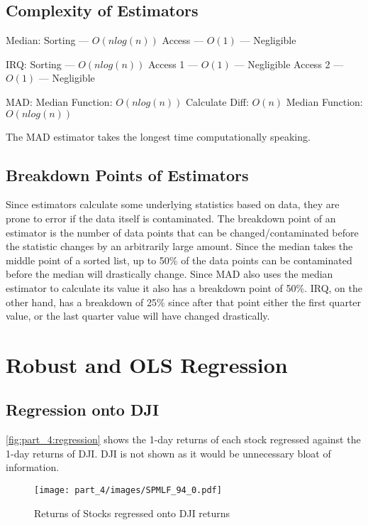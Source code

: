 \subsection{Complexity of Estimators}
Median:    
Sorting — $O(nlog(n))$  
Access — $O(1)$ — Negligible  

IRQ:  
Sorting — $O(nlog(n))$  
Access 1 — $O(1)$ — Negligible  
Access 2 — $O(1)$ — Negligible  

MAD:  
Median Function: $O(nlog(n))$   
Calculate Diff: $O(n)$  
Median Function: $O(nlog(n))$ 

The MAD estimator takes the longest time computationally speaking.

\subsection{Breakdown Points of Estimators}

Since estimators calculate some underlying statistics based on data, they are prone to error if the data itself is contaminated. The breakdown point of an estimator is the number of data points that can be changed/contaminated before the statistic changes by an arbitrarily large amount. Since the median takes the middle point of a sorted list, up to 50\% of the data points can be contaminated before the median will drastically change. Since MAD also uses the median estimator to calculate its value it also has a breakdown point of 50\%. IRQ, on the other hand, has a breakdown of 25\% since after that point either the first quarter value, or the last quarter value will have changed drastically.

\section{Robust and OLS Regression}

\subsection{Regression onto DJI}

\autoref{fig:part_4:regression} shows the 1-day returns of each stock regressed against the 1-day returns of DJI. DJI is not shown as it would be unnecessary bloat of information.

\begin{figure}[!htb]
    \centering
    \texttt{[image: part\_4/images/SPMLF\_94\_0.pdf]}
    \caption{Returns of Stocks regressed onto DJI returns}
    \label{fig:part_4:regression}
\end{figure}

